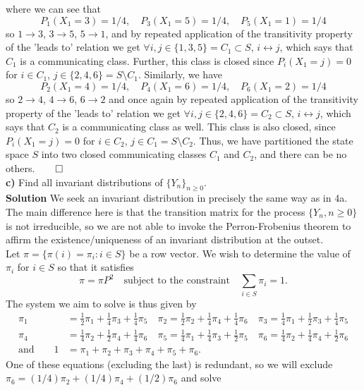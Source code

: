 \documentclass[11pt, letterpaper]{article}
\begin{document}
    where we can see that
    \[P_1(X_1=3)=1/4,\quad P_3(X_1=5)=1/4,\quad P_5(X_1=1)=1/4\]
    so $1\longrightarrow 3$, $3\longrightarrow 5$, $5\longrightarrow 1$, and by repeated application of the transitivity property of the 'leads to' relation we get $\forall i,j\in \{1,3,5\}=C_1\subset S$, $i\longleftrightarrow j$, which says that $C_1$ is a communicating class. Further, this class is closed since
    $P_i(X_1=j)=0$ for $i\in C_1$, $j\in\{2, 4, 6\}=S\setminus C_1$. Similarly, we have
    \[P_2(X_1=4)=1/4,\quad P_4(X_1=6)=1/4,\quad P_6(X_1=2)=1/4\]
    so $2\longrightarrow 4$, $4\longrightarrow 6$, $6\longrightarrow 2$ and once again by repeated application of the transitivity property of the 'leads to' relation we get $\forall i,j\in\{2,4,6\}=C_2\subset S$, $i\longleftrightarrow j$, which says that $C_2$ is a communicating class as well. This class is also closed, since
    $P_i(X_1=j)=0$ for $i\in C_2$, $j\in C_1=S\setminus C_2$. Thus, we have partitioned the state space $S$ into two closed communicating classes $C_1$ and $C_2$, and there can be no others.\hfill{$\qed$}\\[10pt]
    {\bf c)} Find all invariant distributions of $\{Y_n\}_{n\geq 0}$.\\[10pt]
    {\bf Solution} We seek an invariant distribution in precisely the same way as in 4a. The main difference here is that the transition matrix for the process $\{Y_n,n\geq 0\}$ is not irreducible, so we are
    not able to invoke the Perron-Frobenius theorem to affirm the existence/uniqueness of an invariant distribution at the outset.\\[10pt]
    Let $\pi=\{\pi(i)=\pi_i: i\in S\}$ be a row vector. We wish to determine the value of $\pi_i$ for $i\in S$ so that it satisfies
    \[\pi=\pi P^2\quad\text{subject to the constraint}\quad \sum_{i\in S}\pi_i=1.\]
    The system we aim to solve is thus given by
    \begin{align*}
        \pi_1&=\frac{1}{2}\pi_1+\frac{1}{4}\pi_3+\frac{1}{4}\pi_5\quad
        \pi_2=\frac{1}{2}\pi_2+\frac{1}{4}\pi_4+\frac{1}{4}\pi_6\quad
        \pi_3=\frac{1}{4}\pi_1+\frac{1}{2}\pi_3+\frac{1}{4}\pi_5\\
        \pi_4&=\frac{1}{4}\pi_2+\frac{1}{2}\pi_4+\frac{1}{4}\pi_6\quad
        \pi_5=\frac{1}{4}\pi_1+\frac{1}{4}\pi_3+\frac{1}{2}\pi_5\quad
        \pi_6=\frac{1}{4}\pi_2+\frac{1}{4}\pi_4+\frac{1}{2}\pi_6\\
        \text{and}\qquad 1&=\pi_1+\pi_2+\pi_3+\pi_4+\pi_5+\pi_6.
    \end{align*}
    One of these equations (excluding the last) is redundant, so we will exclude $\pi_6=(1/4)\pi_2+(1/4)\pi_4+(1/2)\pi_6$ and solve
\end{document}
